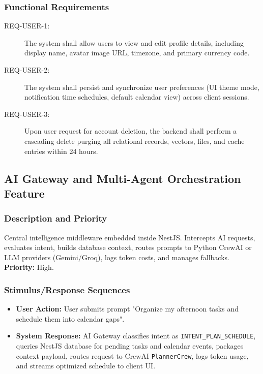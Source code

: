 \documentclass[11pt,a4paper]{article}
\begin{document}
\subsubsection{Functional Requirements}
\begin{description}
    \item[REQ-USER-1:] The system shall allow users to view and edit profile details, including display name, avatar image URL, timezone, and primary currency code.
    \item[REQ-USER-2:] The system shall persist and synchronize user preferences (UI theme mode, notification time schedules, default calendar view) across client sessions.
    \item[REQ-USER-3:] Upon user request for account deletion, the backend shall perform a cascading delete purging all relational records, vectors, files, and cache entries within 24 hours.
\end{description}

\subsection{AI Gateway and Multi-Agent Orchestration Feature}
\subsubsection{Description and Priority}
Central intelligence middleware embedded inside NestJS. Intercepts AI requests, evaluates intent, builds database context, routes prompts to Python CrewAI or LLM providers (Gemini/Groq), logs token costs, and manages fallbacks. \\
\textbf{Priority:} High.

\subsubsection{Stimulus/Response Sequences}
\begin{itemize}
    \item \textbf{User Action:} User submits prompt "Organize my afternoon tasks and schedule them into calendar gaps".
    \item \textbf{System Response:} AI Gateway classifies intent as \texttt{INTENT\_PLAN\_SCHEDULE}, queries NestJS database for pending tasks and calendar events, packages context payload, routes request to CrewAI \texttt{PlannerCrew}, logs token usage, and streams optimized schedule to client UI.
\end{itemize}
\end{document}
